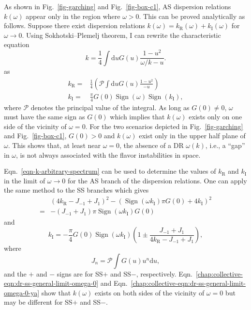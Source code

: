 As shown in Fig.~\ref{fig-garching} and Fig.~\ref{fig-box-c1}, AS dispersion relations $k(\omega)$ appear only in the region where $\omega > 0$. This can be proved analytically as follows.
Suppose there exist dispersion relations $k(\omega) = k_{\mathrm R}(\omega) + k_{\mathrm I}(\omega)$ for $\omega \to 0$. Using Sokhotski–Plemelj theorem, I can rewrite the characteristic equation
\begin{equation}
   k = \frac{1}{4} \int \mathrm du G(u) \frac{ 1 - u^2 }{ \omega/k - u }.
   \label{chap:collective-eqn:k-omega-relation}
\end{equation}
as
\begin{subequations}
\begin{align}
k_{\mathrm R} =& \frac{1}{4}\left(  \mathcal{P} \int \mathrm d u G(u) \frac{ 1 - u^2 }{ - u }  \right)\label{eqn-re-k-arbitrary-spectrum} \\
k_{\mathrm I} =&  \frac{\pi}{4}G(0) \operatorname{Sign}\left( \omega \right) \operatorname{Sign}\left(  k_{\mathrm I}  \right),
\label{eqn-im-k-arbitrary-spectrum}
\end{align}
\label{eqn-k-arbitrary-spectrum}
\end{subequations}
where $\mathcal P$ denotes the principal value of the integral. As long as $G(0)\neq 0$, $\omega$ must have the same sign as $G(0)$ which implies that $k(\omega)$ exists only on one side of the vicinity of $\omega=0$. For the two scenarios depicted in Fig.~\ref{fig-garching} and Fig.~\ref{fig-box-c1}, $G(0)>0$ and $k(\omega)$ exist only in the upper half plane of $\omega$. This shows that, at least near $\omega =0$, the absence of a DR $\omega(k)$, i.e., a ``gap'' in $\omega$, is not always associated with the flavor instabilities in space.

Eqn.~\eqref{eqn-k-arbitrary-spectrum} can be used to determine the values of $k_{\mathrm R}$ and $k_{\mathrm I}$ in the limit of $\omega\to 0$ for the AS branch of the dispersion relations. One can apply the same method to the SS branches which gives
\begin{align}
&\left(4 k_{\mathrm R} - J_{-1} + J_1 \right)^2  - \left( \operatorname{Sign}(\omega k_{\mathrm I} )\pi G(0) +4 k_{\mathrm I} \right)^2 \nonumber\\
=& - \left( J_{-1} + J_1 \right) \pi \operatorname{Sign}(\omega k_{\mathrm I} ) G(0)
\label{chap:collective-eqn:dr-ss-general-limit-omega-0}
\end{align}
and
\begin{equation}
   k_{\mathrm I} = - \frac{\pi}{4} G(0) \operatorname{Sign}(\omega k_{\mathrm I} ) \left(  1 \pm \frac{ J_{-1} +  J_1 }{ 4 k_{\mathrm R} - J_{-1} + J_1}  \right),
   \label{chap:collective-eqn:dr-ss-general-limit-omega-0-ya}
\end{equation}
where
\begin{equation}
J_{n} = \mathcal P \int G(u)u^n \mathrm du,
\end{equation}
and the $+$ and $-$ signs are for SS$+$ and SS$-$, respectively. Eqn.~\eqref{chap:collective-eqn:dr-ss-general-limit-omega-0} and Eqn.~\eqref{chap:collective-eqn:dr-ss-general-limit-omega-0-ya} show that $k(\omega)$ exists on both sides of the vicinity of $\omega=0$ but may be different for SS$+$ and SS$-$.


